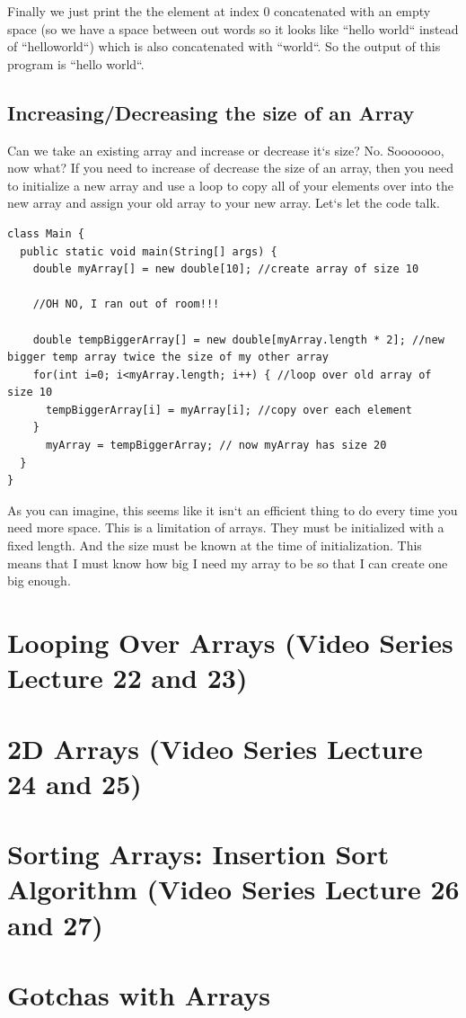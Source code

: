\documentclass[11]{article}
\begin{document}
Finally we just print the the element at index $0$ concatenated with an empty space (so we have a space between out words so it looks like ``hello world`` instead of ``helloworld``) which is also concatenated with ``world``. So the output of this program is ``hello world``.

\subsection{Increasing/Decreasing the size of an Array}
Can we take an existing array and increase or decrease it`s size? No. Sooooooo, now what? If you need to increase of decrease the size of an array, then you need to initialize a new array and use a loop to copy all of your elements over into the new array and assign your old array to your new array. Let`s let the code talk.

\begin{lstlisting}
class Main {
  public static void main(String[] args) {
    double myArray[] = new double[10]; //create array of size 10

    //OH NO, I ran out of room!!!

    double tempBiggerArray[] = new double[myArray.length * 2]; //new bigger temp array twice the size of my other array
    for(int i=0; i<myArray.length; i++) { //loop over old array of size 10
      tempBiggerArray[i] = myArray[i]; //copy over each element
    }
      myArray = tempBiggerArray; // now myArray has size 20
  }
}
\end{lstlisting}

As you can imagine, this seems like it isn`t an efficient thing to do every time you need more space. This is a limitation of arrays. They must be initialized with a fixed length. And the size must be known at the time of initialization. This means that I must know how big I need my array to be so that I can create one big enough.
\section{Looping Over Arrays (Video Series Lecture 22 and 23)}
\section{2D Arrays (Video Series Lecture 24 and 25)}
\section{Sorting Arrays: Insertion Sort Algorithm (Video Series Lecture 26 and 27)}
\section{Gotchas with Arrays}
\label{sec:gotchas}
\end{document}
